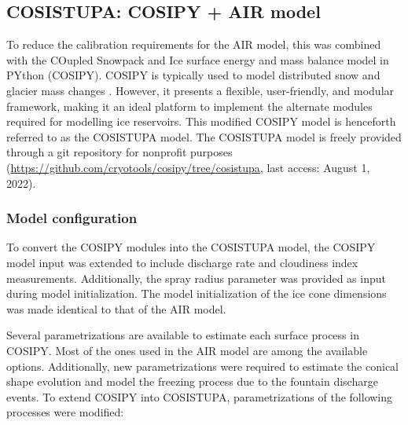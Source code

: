 \subsection{COSISTUPA: COSIPY + AIR model}
\label{sec:Cosistupa}

To reduce the calibration requirements for the AIR model, this was combined with the COupled
Snowpack and Ice surface energy and mass balance model in PYthon (COSIPY). COSIPY is typically used to
model distributed snow and glacier mass changes \citep{sauterCOSIPYV1Opensource2020}. However, it presents a
flexible, user-friendly, and modular framework, making it an ideal platform to implement the alternate
modules required for modelling ice reservoirs. This modified COSIPY model is henceforth referred to as the COSISTUPA model. The COSISTUPA model is freely provided through a git repository for nonprofit purposes
(\url{https://github.com/cryotools/cosipy/tree/cosistupa}, last access: August 1, 2022). 


\subsubsection{Model configuration}

To convert the COSIPY modules into the COSISTUPA model, the COSIPY model input was extended to include discharge rate and cloudiness index measurements. Additionally, the spray radius parameter was provided as input during model initialization. The model initialization of the ice
cone dimensions was made identical to that of the AIR model.

Several parametrizations are available to estimate each surface process in COSIPY. Most of the ones
used in the AIR model are among the available options. Additionally, new parametrizations were required to
estimate the conical shape evolution and model the freezing process due to the fountain discharge events. To
extend COSIPY into COSISTUPA, parametrizations of the following processes were modified:

